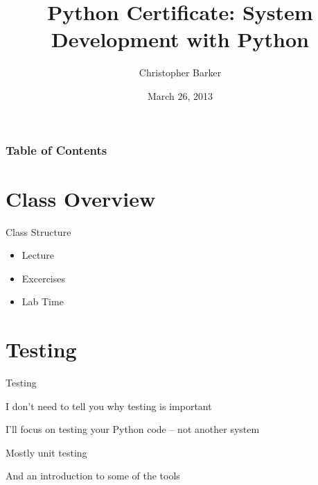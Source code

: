 \documentclass{beamer}
\title[Intro to Python: Week 1]{Python Certificate: System Development with Python}
\author{Christopher Barker}
\institute{UW Continuing Education}
\date{March 26, 2013}
\begin{document}
\begin{frame}
  \titlepage
\end{frame}

\begin{frame}
\frametitle{Table of Contents}
  \tableofcontents
\end{frame}


\section{Class Overview}

\begin{frame}[fragile]{Class Structure}

{\Large
\vfill
\begin{itemize}
  \item Lecture
  \item Excercises
  \item Lab Time
\end{itemize}
}

\vfill

\end{frame}


\section{Testing}


\begin{frame}[fragile]{Testing}

\vfill
{\Large I don't need to tell you why testing is important}

\vfill
{\Large I'll focus on testing your Python code -- not another system}

\vfill
{\Large Mostly unit testing}

\vfill
{\Large And an introduction to some of the tools}

\vfill

\end{frame} 
\end{document}

